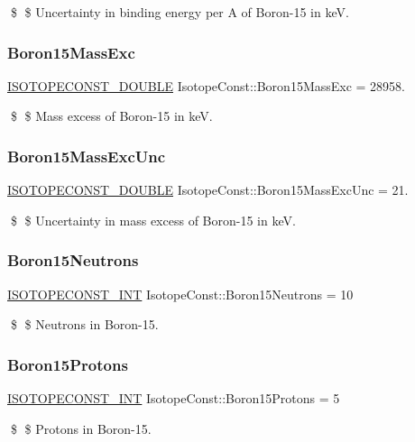 \$ \$ Uncertainty in binding energy per A of Boron-\/15 in keV. \mbox{\label{group___isotope_const-_boron-_b15_ga330609d4122d4b8a3e156153dccebcff}} 
\subsubsection{\texorpdfstring{Boron15\+Mass\+Exc}{Boron15MassExc}}
{\footnotesize\ttfamily \mbox{\hyperlink{group___isotope_const-_macros_ga8f45a7272ce02c0b4c65c44636ed719a}{I\+S\+O\+T\+O\+P\+E\+C\+O\+N\+S\+T\+\_\+\+D\+O\+U\+B\+LE}} Isotope\+Const\+::\+Boron15\+Mass\+Exc = 28958.}

\$ \$ Mass excess of Boron-\/15 in keV. \mbox{\label{group___isotope_const-_boron-_b15_gac137b1d969a7856575ad4c8b20e8bf3c}} 
\subsubsection{\texorpdfstring{Boron15\+Mass\+Exc\+Unc}{Boron15MassExcUnc}}
{\footnotesize\ttfamily \mbox{\hyperlink{group___isotope_const-_macros_ga8f45a7272ce02c0b4c65c44636ed719a}{I\+S\+O\+T\+O\+P\+E\+C\+O\+N\+S\+T\+\_\+\+D\+O\+U\+B\+LE}} Isotope\+Const\+::\+Boron15\+Mass\+Exc\+Unc = 21.}

\$ \$ Uncertainty in mass excess of Boron-\/15 in keV. \mbox{\label{group___isotope_const-_boron-_b15_gaaa485148a90557d3691bf3a56a78695d}} 
\subsubsection{\texorpdfstring{Boron15\+Neutrons}{Boron15Neutrons}}
{\footnotesize\ttfamily \mbox{\hyperlink{group___isotope_const-_macros_ga5f18360b3e99483a35c32d789e62621c}{I\+S\+O\+T\+O\+P\+E\+C\+O\+N\+S\+T\+\_\+\+I\+NT}} Isotope\+Const\+::\+Boron15\+Neutrons = 10}

\$ \$ Neutrons in Boron-\/15. \mbox{\label{group___isotope_const-_boron-_b15_gaf50956b5f1c5a16f0ac206dbb7ce7eb0}} 
\subsubsection{\texorpdfstring{Boron15\+Protons}{Boron15Protons}}
{\footnotesize\ttfamily \mbox{\hyperlink{group___isotope_const-_macros_ga5f18360b3e99483a35c32d789e62621c}{I\+S\+O\+T\+O\+P\+E\+C\+O\+N\+S\+T\+\_\+\+I\+NT}} Isotope\+Const\+::\+Boron15\+Protons = 5}

\$ \$ Protons in Boron-\/15. 